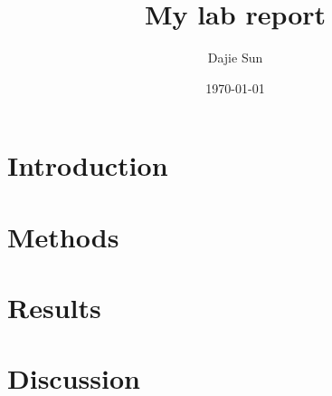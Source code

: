 \documentclass[11pt]{article}
\title{My lab report}
\author{Dajie Sun}
\date{\today}
\begin{document}
\maketitle

\section*{Introduction}
\label{sec:intro}


\section*{Methods}
\label{sec:meth}


\section*{Results}
\label{sec:res}


\section*{Discussion}
\label{sec:disc}




\end{document}
